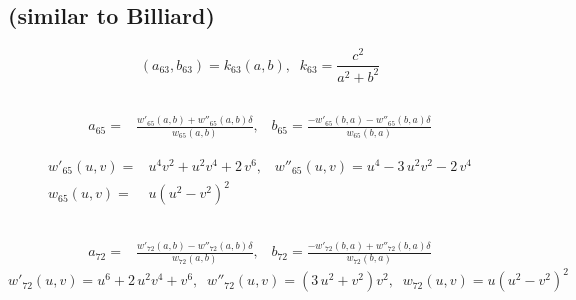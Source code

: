 \subsection{ (similar to Billiard)}
\begin{equation*}
\left(a_{63},b_{63}\right)=k_{63}\left(a,b\right),\;\; k_{63}=\frac{c^2}{a^2+b^2}
\end{equation*}

\subsection{}


\begin{align*}
a_{65}=& \frac{w'_{65}(a,b) + w''_{65}(a,b) \delta}{  w_{65}(a,b)},\;\;\;
b_{65}=\frac{-w'_{65}(b,a)- w''_{65}(b,a) \delta}{  w_{65}(b,a)}
\end{align*}

\begin{align*}
w'_{65}(u,v)=& {u}^{4}{v}^{2}+{u}^{2}{v}^{4}+2\,{v}^{6},\;\;\;
w''_{65}(u,v)={u}^{4}-3\,{u}^{2}{v}^{2}-2\,{v}^{4}\\
w_{65}(u,v)=&u\left( {u}^{2}-{v}^{2} \right) ^{2}
\end{align*}

\subsection{}
\begin{align*}
a_{72}=& \frac{w'_{72}(a,b) - w''_{72}(a,b) \delta }{w_{72}(a,b)},\;\;\;
b_{72}= \frac{-w'_{72}(b,a) + w''_{72}(b,a) \delta}{w_{72}(b,a) }
\end{align*}
{\small  
\begin{equation*}
w'_{72}(u,v)= {u}^{6}+2\,{u}^{2}{v}^{4}+{v}^{6},\;\;
w''_{72}(u,v)= (3\,{u}^{2}+{v}^{2}){v}^{2},\;\;
w_{72}(u,v)= u\left(u^2-v^2 \right)^{2}
\end{equation*}
}
          
